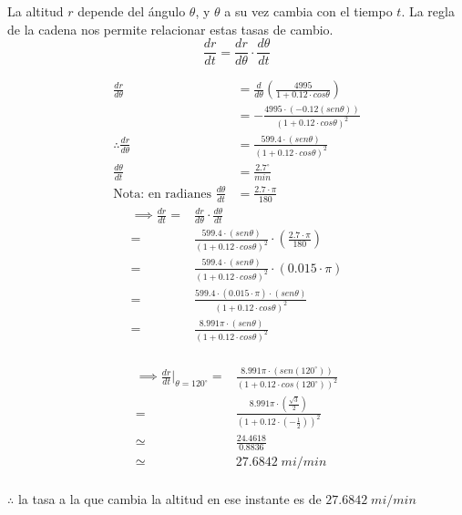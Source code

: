 La altitud $r$ depende del ángulo $\theta$, y $\theta$ a su vez cambia con el tiempo $t$. La regla de la cadena nos permite relacionar estas tasas de cambio.
$$\frac{dr}{dt}=\frac{dr}{d\theta}\cdot\frac{d\theta}{dt}$$
\begin{multicols}{2}
	\noindent
	\begin{align*}
		\frac{dr}{d\theta}                          & =\frac{d}{d\theta}\left(\frac{4995}{1+0.12\cdot cos\theta}\right)                                 \\
		                                            & =-\frac{4995\cdot\left(-0.12\left(sen \theta\right)\right)}{\left(1+0.12\cdot cos\theta\right)^2} \\
		\therefore \frac{dr}{d\theta}               & =\frac{599.4\cdot\left(sen \theta\right)}{\left(1+0.12\cdot cos\theta\right)^2}                   \\
		\frac{d\theta}{dt}                          & = \frac{2.7^\circ}{min}                                                                           \\
		\text{Nota: en radianes }\frac{d\theta}{dt} & = \frac{2.7\cdot\pi}{180}
	\end{align*}
	\columnbreak
	\begin{align*}
		\implies\frac{dr}{dt}= & \frac{dr}{d\theta}\cdot\frac{d\theta}{dt}                                                                               \\
		=                      & \frac{599.4\cdot\left(sen \theta\right)}{\left(1+0.12\cdot cos\theta\right)^2}\cdot\left(\frac{2.7\cdot\pi}{180}\right) \\
		=                      & \frac{599.4\cdot\left(sen \theta\right)}{\left(1+0.12\cdot cos\theta\right)^2}\cdot\left(0.015\cdot\pi\right)           \\
		=                      & \frac{599.4\cdot\left(0.015\cdot\pi\right)\cdot\left(sen \theta\right)}{\left(1+0.12\cdot cos\theta\right)^2}           \\
		=                      & \frac{8.991\pi\cdot\left(sen \theta\right)}{\left(1+0.12\cdot cos\theta\right)^2}                                       \\
	\end{align*}
\end{multicols}
\vspace{-30px}
\begin{align*}
	\implies\frac{dr}{dt}\bigg|_{\theta=120^\circ}= & \frac{8.991\pi\cdot\left(sen (120^\circ)\right)}{\left(1+0.12\cdot cos(120^\circ)\right)^2}    \\
	=                                               & \frac{8.991\pi\cdot\left(\frac{\sqrt{3}}{2}\right)}{\left(1+0.12\cdot (-\frac{1}{2})\right)^2} \\
	\simeq                                          & \frac{24.4618}{0.8836}                                                                         \\
	\simeq                                          & 27.6842\;mi/min                                                                                \\
\end{align*}

$\therefore$ la tasa a la que cambia la altitud en ese instante es de $27.6842\;mi/min$